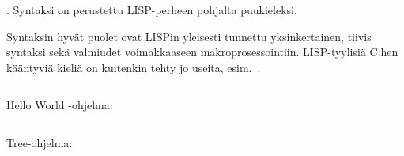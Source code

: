 
\bnfdescription.
Syntaksi on perustettu LISP-perheen pohjalta puukieleksi.

Syntaksin hyvät puolet ovat LISPin yleisesti tunnettu yksinkertainen, tiivis
syntaksi sekä valmiudet voimakkaaseen makroprosessointiin. LISP-tyylisiä C:hen
kääntyviä kieliä on kuitenkin tehty jo useita, esim.~\citet{clisp3}.

\inputminted{\bnflexer}{lisp-base.bnf}

Hello World -ohjelma:

\inputminted{lisp}{hello.lisp}

\newpage

Tree-ohjelma:

\inputminted{lisp}{tree.lisp}
